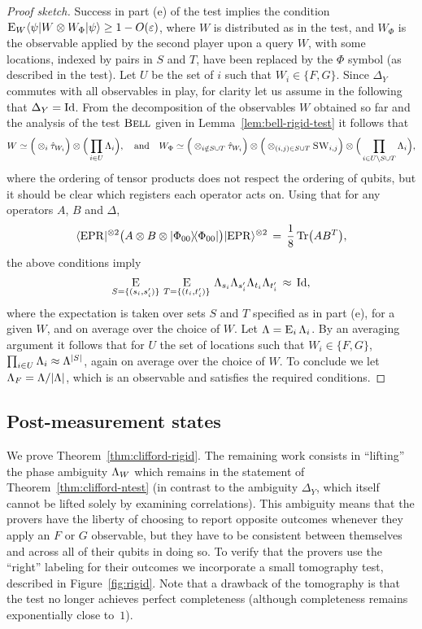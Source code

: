 \begin{proof}[Proof sketch]
Success in part (e) of the test implies the condition $ \mathop{\textsc{E}}_{W} \langle\psi| W
  \otimes W_\Phi |\psi\rangle \geq 1-O(\varepsilon)$, where $W$ is distributed as in the
  test, and $W_{\Phi}$ is the observable applied by the second player upon a
  query $W$, with some locations, indexed by pairs in $S$ and $T$, have been
  replaced by the $\Phi$ symbol (as described in the test). Let $U$ be the set of $i$ such that $W_i\in \{F,G\}$. Since $\Delta_Y$ commutes with all observables in play, for clarity let us assume in the following that $\Delta_Y = \mathop{\rm Id}\nolimits$. 
From the decomposition of the observables $W$ obtained so far and the analysis of the test $\textsc{Bell}$ given in Lemma~\ref{lem:bell-rigid-test} it follows that 
$$W \simeq \Big(\otimes_i {\hat{\tau}_{W_i}} \Big)\otimes \Big(\prod_{i\in U} \Lambda_i\Big),\quad\text{and}\quad W_\Phi \simeq  \Big(\otimes_{i\notin S\cup T} {\hat{\tau}_{W_i}}\Big)\otimes\Big( \otimes_{(i,j)\in S\cup T} \textsc{SW}_{i,j} \Big)\otimes \Big(\prod_{i\in U\backslash S\cup T} \Lambda_i\Big),$$
where the ordering of tensor products does not respect the ordering of qubits, but it should be clear which registers each operator acts on. Using that for any operators $A$, $B$ and $\Delta$, 
$$\langle{\rm EPR}|^{\otimes 2}  \big(A \otimes B \otimes |\Phi_{00}\rangle\!\langle\Phi_{00}|\big)|{\rm EPR}\rangle^{\otimes 2}  \,=\, \frac{1}{8}\,\mbox{\rm Tr}\big(AB^T\big) ,$$
the above conditions imply 
$$\mathop{\textsc{E}}_{S=\{(s_i,s'_i)\}}\, \mathop{\textsc{E}}_{T=\{(t_i,t'_i)\}} \, \Lambda_{s_i}\Lambda_{s'_i} \Lambda_{t_i}\Lambda_{t'_i} \,\approx\, \mathop{\rm Id}\nolimits,$$
where the expectation is taken over sets $S$ and $T$ specified as in part (e), for a given $W$, and on average over the choice of $W$. Let $\Lambda = \mathop{\textsc{E}}_{i} \Lambda_i$. By an averaging argument it follows that for $U$ the set of locations such that $W_i \in \{F,G\}$, $\prod_{i\in U} \Lambda_i \approx \Lambda^{|S|}$, again on average over the choice of $W$. To conclude we let $\Lambda_F = \Lambda/|\Lambda|$, which is an observable and satisfies the required conditions. 
\end{proof}


\subsection{Post-measurement states}
\label{sec: RIGID test}

We prove Theorem~\ref{thm:clifford-rigid}. The remaining work consists in ``lifting'' the phase ambiguity $\Lambda_W$ which remains in the statement of Theorem~\ref{thm:clifford-ntest} (in contrast to the ambiguity $\Delta_Y$, which itself cannot be lifted solely by examining correlations). This ambiguity means that the provers have the liberty of choosing to report opposite outcomes whenever they apply an $F$ or $G$ observable, but they have to be consistent between themselves and across all of their qubits in doing so. To verify that the provers use the ``right'' labeling for their outcomes we incorporate a small tomography test, described in Figure~\ref{fig:rigid}. Note that a drawback of the tomography is that the test no longer achieves perfect completeness (although completeness remains exponentially close to~$1$). 

